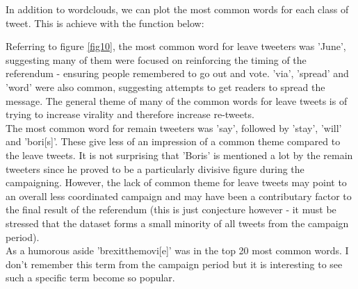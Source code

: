 \documentclass[10pt]{article}
\begin{document}
In addition to wordclouds, we can plot the most common words for each class of tweet. This is achieve with the function below:
\hspace{1cm} 
\begin{Schunk}
\end{Schunk}
\hspace{1cm} 
Referring to figure \ref{fig10}, the most common word for leave tweeters was 'June', suggesting many of them were focused on reinforcing the timing of the referendum - ensuring people remembered to go out and vote. 'via', 'spread' and 'word' were also common, suggesting attempts to get readers to spread the message. The general theme of many of the common words for leave tweets is of trying to increase virality and therefore increase re-tweets.\\
The most common word for remain tweeters was 'say', followed by 'stay', 'will' and 'bori[s]'. These give less of an impression of a common theme compared to the leave tweets. It is not surprising that 'Boris' is mentioned a lot by the remain tweeters since he proved to be a particularly divisive figure during the campaigning. However, the lack of common theme for leave tweets may point to an overall less coordinated campaign and may have been a contributary factor to the final result of the referendum (this is just conjecture however - it must be stressed that the dataset forms a small minority of all tweets from the campaign period).\\
As a humorous aside 'brexitthemovi[e]' was in the top 20 most common words. I don't remember this term from the campaign period but it is interesting to see such a specific term become so popular.
\hspace{1cm} 
\end{document}
